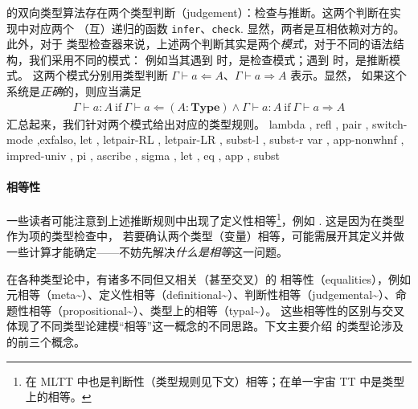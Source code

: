 \Tigrisd 的双向类型算法存在两个类型判断（judgement）：检查与推断。这两个判断在实现中对应两个
（互）递归的函数 \texttt{infer}、\texttt{check}. 显然，两者是互相依赖对方的。此外，对于
类型检查器来说，上述两个判断其实是两个\emph{模式}，对于不同的语法结构，我们采用不同的模式：
例如当其遇到  时，是检查模式；遇到  时，是推断模式。
这两个模式分别用类型判断 $\Gamma\vdash a\Leftarrow A$、$\Gamma\vdash a\Rightarrow A$ 表示。显然，
如果这个系统是\emph{正确}的，则应当满足
{\setlength{\abovedisplayskip}{3pt}\setlength{\belowdisplayskip}{3pt}
  \begin{align*}
    \Gamma\vdash a : A\ \text{if}\ \Gamma\vdash a\Leftarrow (A : \mathbf{Type})\wedge
    \Gamma\vdash a : A\ \text{if}\ \Gamma\vdash a\Rightarrow A
  \end{align*}
}
汇总起来，我们针对两个模式给出对应的类型规则。
{ lambda
  , refl
  , pair
  , switch-mode
  ,exfalso, let
  , letpair-RL
  , letpair-LR
  , subst-l
  , subst-r
}
{ var
  , app-nonwhnf
  , impred-univ
  , pi
  , ascribe
  , sigma
  , let
  , eq
  , app
, subst}

\paragraph{相等性} 一些读者可能注意到上述推断规则中出现了定义性相等\footnote{
  在 MLTT 中也是判断性（类型规则见下文）相等；在单一宇宙 TT 中是类型上的相等。
}，例如 . 这是因为在类型作为项的类型检查中，
若要确认两个类型（变量）相等，可能需展开其定义并做一些计算才能确定——不妨先解决\emph{什么是相等}这一问题。

在各种类型论中，有诸多不同但又相关（甚至交叉）的
相等性（equalities），例如元相等（meta\textasciitilde）、定义性相等（definitional\textasciitilde）、判断性相等（judgemental\textasciitilde）、命题性相等（propositional\textasciitilde）、类型上的相等（typal\textasciitilde）。
这些相等性的区别与交叉体现了不同类型论建模“相等”这一概念的不同思路。下文主要介绍 \Tigrisd 的类型论涉及的前三个概念。

